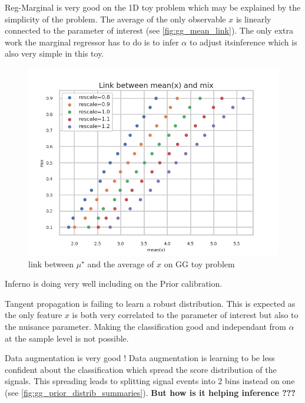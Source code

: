 Reg-Marginal is very good on the 1D toy problem which may be explained by the simplicity of the problem.
The average of the only observable $x$ is linearly connected to the parameter of interest (see \autoref{fig:gg_mean_link}).
The only extra work the marginal regressor has to do is to infer $\alpha$ to adjust itsinference which is also very simple in this toy.

\begin{figure}[ht!]
  \centering
  \includegraphics[width=0.49\linewidth]{GG/mean_link.png}
  \caption{link between $\mu^\star$ and the average of $x$ on GG toy problem}
  \label{fig:gg_mean_link}
\end{figure}


Inferno is doing very well including on the Prior calibration.

Tangent propagation is failing to learn a robust distribution.
This is expected as the only feature $x$ is both very correlated to the parameter of interest but also to the nuisance parameter.
Making the classification good and independant from $\alpha$ at the sample level is not possible.

Data augmentation is very good !
Data augmentation is learning to be less confident about the classification which spread the score distribution of the signals.
This spreading leads to splitting signal events into 2 bins instead on one (see \autoref{fig:gg_prior_distrib_summaries}).
\textbf{But how is it helping inference ???}

